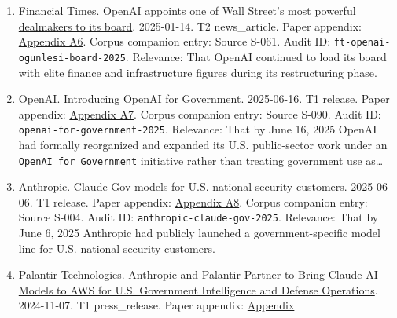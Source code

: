 \documentclass[
  american,
  11pt,
  letterpaper,
]{article}
\begin{document}
\begin{enumerate}
  company\_statement. Paper appendix:
  \hyperref[ch-08-appendix-a5-openai-board-forms-safety-and-security-committee]{Appendix
  A5}. Corpus companion entry: Source S-089. Audit ID:
  \texttt{openai-board-forms-safety-security-committee-2024}. Relevance:
  That OpenAI publicly moved safety and security oversight to a named
  board-level structure after the governance crisis.
\item
  Financial Times.
  \href{https://www.ft.com/content/63b08a9d-e537-4d60-9904-c59958a16982}{OpenAI
  appoints one of Wall Street's most powerful dealmakers to its board}.
  2025-01-14. T2 news\_article. Paper appendix:
  \hyperref[ch-08-appendix-a6-openai-appoints-one-of-wall-street-s-most-powerful-dealmakers-to-its-board]{Appendix
  A6}. Corpus companion entry: Source S-061. Audit ID:
  \texttt{ft-openai-ogunlesi-board-2025}. Relevance: That OpenAI
  continued to load its board with elite finance and infrastructure
  figures during its restructuring phase.
\item
  OpenAI.
  \href{https://openai.com/global-affairs/introducing-openai-for-government/}{Introducing
  OpenAI for Government}. 2025-06-16. T1 release. Paper appendix:
  \hyperref[ch-08-appendix-a7-introducing-openai-for-government]{Appendix
  A7}. Corpus companion entry: Source S-090. Audit ID:
  \texttt{openai-for-government-2025}. Relevance: That by June 16, 2025
  OpenAI had formally reorganized and expanded its U.S. public-sector
  work under an \texttt{OpenAI\ for\ Government} initiative rather than
  treating government use as\ldots{}
\item
  Anthropic.
  \href{https://www.anthropic.com/news/claude-gov-models-for-u-s-national-security-customers}{Claude
  Gov models for U.S. national security customers}. 2025-06-06. T1
  release. Paper appendix:
  \hyperref[ch-08-appendix-a8-claude-gov-models-for-u-s-national-security-customers]{Appendix
  A8}. Corpus companion entry: Source S-004. Audit ID:
  \texttt{anthropic-claude-gov-2025}. Relevance: That by June 6, 2025
  Anthropic had publicly launched a government-specific model line for
  U.S. national security customers.
\item
  Palantir Technologies.
  \href{https://investors.palantir.com/news-details/2024/Anthropic-and-Palantir-Partner-to-Bring-Claude-AI-Models-to-AWS-for-U.S.-Government-Intelligence-and-Defense-Operations/}{Anthropic
  and Palantir Partner to Bring Claude AI Models to AWS for U.S.
  Government Intelligence and Defense Operations}. 2024-11-07. T1
  press\_release. Paper appendix:
  \hyperref[ch-08-appendix-a9-anthropic-and-palantir-partner-to-bring-claude-ai-models-to-aws-for-u-s-government-intelligence-and-defense-operations]{Appendix
}
\end{enumerate}
\end{document}
